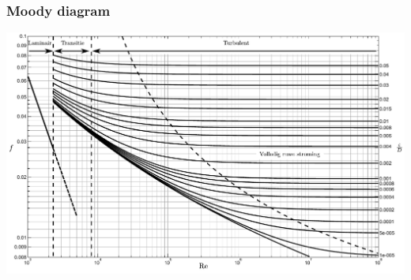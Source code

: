\documentclass[t]{beamer}
\begin{document}
  	\begin{frame}
		\frametitle{Moody diagram}
		\center
		\includegraphics[width=\textwidth]{fig/stroming_in_leidingen/Moody_diagram_regimes}
	\end{frame}
\end{document}
